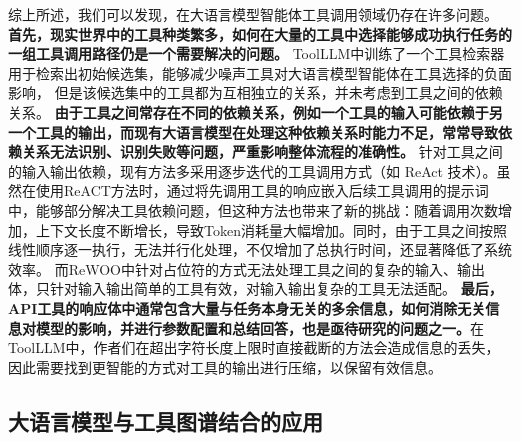 

综上所述，我们可以发现，在大语言模型智能体工具调用领域仍存在许多问题。
\textbf{首先，现实世界中的工具种类繁多，如何在大量的工具中选择能够成功执行任务的一组工具调用路径仍是一个需要解决的问题。}
ToolLLM\cite{Qin2023}中训练了一个工具检索器用于检索出初始候选集，能够减少噪声工具对大语言模型智能体在工具选择的负面影响，
但是该候选集中的工具都为互相独立的关系，并未考虑到工具之间的依赖关系。
\textbf{由于工具之间常存在不同的依赖关系，例如一个工具的输入可能依赖于另一个工具的输出，而现有大语言模型在处理这种依赖关系时能力不足，常常导致依赖关系无法识别、识别失败等问题，严重影响整体流程的准确性。}
针对工具之间的输入输出依赖，现有方法多采用逐步迭代的工具调用方式（如 ReAct 技术\cite{Yao2023b}）。虽然在使用ReACT方法时，通过将先调用工具的响应嵌入后续工具调用的提示词中，能够部分解决工具依赖问题，但这种方法也带来了新的挑战：随着调用次数增加，上下文长度不断增长，导致Token消耗量大幅增加。同时，由于工具之间按照线性顺序逐一执行，无法并行化处理，不仅增加了总执行时间，还显著降低了系统效率。
而ReWOO\cite{xu2023rewoo}中针对占位符的方式无法处理工具之间的复杂的输入、输出体，只针对输入输出简单的工具有效，对输入输出复杂的工具无法适配。
\textbf{最后，API工具的响应体中通常包含大量与任务本身无关的多余信息，如何消除无关信息对模型的影响，并进行参数配置和总结回答，也是亟待研究的问题之一。}在ToolLLM\cite{Qin2023}中，作者们在超出字符长度上限时直接截断的方法会造成信息的丢失，因此需要找到更智能的方式对工具的输出进行压缩，以保留有效信息。

\subsection{大语言模型与工具图谱结合的应用}


